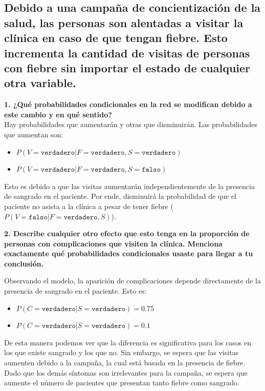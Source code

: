 \documentclass[letterpaper,12pt]{article}
\theoremstyle{definition}
\begin{document}
\subsection*{Debido a una campaña de concientización de la salud, las personas son alentadas a visitar la clínica en caso de que tengan fiebre. Esto incrementa la cantidad de visitas de personas con fiebre sin importar el estado de cualquier otra variable.}

\textbf{1. ¿Qué probabilidades condicionales en la red se modifican debido a este cambio y en qué sentido?}\\

Hay probabilidades que aumentarán y otras que disminuirán. Las probabilidades que aumentan son:\\

\begin{itemize}
	\item \(P(V=\texttt{verdadero}|F=\texttt{verdadero},S=\texttt{verdadero})\)
	\item \(P(V=\texttt{verdadero}|F=\texttt{verdadero},S=\texttt{falso})\)
\end{itemize}
\medskip
Esto es debido a que las visitas aumentarán independientemente de la presencia de sangrado en el paciente. Por ende, disminuirá la probabilidad de que el paciente no asista a la clínica a pesar de tener fiebre (\(P(V=\texttt{falso}|F=\texttt{verdadero},S)\)).

\medskip

\textbf{2. Describe cualquier otro efecto que esto tenga en la proporción de personas con complicaciones que visiten la clínica. Menciona exactamente qué probabilidades condicionales usaste para llegar a tu conclusión.}

\medskip

Observando el modelo, la aparición de complicaciones depende directamente de la presencia de sangrado en el paciente. Esto es:

\begin{itemize}
	\item \( P(C = \texttt{verdadero} | S = \texttt{verdadero}) = 0.75 \)
	\item \( P(C = \texttt{verdadero} | S = \texttt{verdadero}) = 0.1 \)
\end{itemize}

De esta manera podemos ver que la diferencia es significativa para los casos en los que existe sangrado y los que no. Sin embargo, se espera que las visitas aumenten debido a la campaña, la cual está basada en la presencia de fiebre. Dado que los demás síntomas son irrelevantes para la campaña, se espera que aumente el número de pacientes que presentan tanto fiebre como sangrado.
\end{document}
